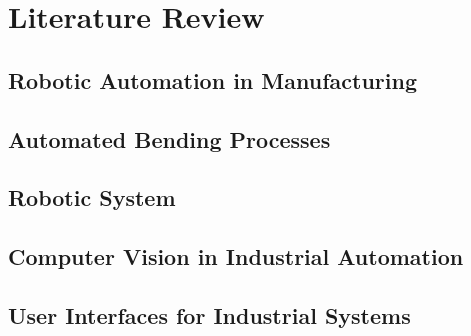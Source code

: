 \chapter{Literature Review}
\label{chap:review}

\setcounter{section}{0}
\setcounter{subsection}{0}
\section{Robotic Automation in Manufacturing}
\label{sec:automation_2}


\section{Automated Bending Processes}
\label{sec:bending_2}


\section{Robotic System}
\label{sec:robot_2}


\section{Computer Vision in Industrial Automation}
\label{sec:CV_2}


\section{User Interfaces for Industrial Systems}
\label{sec:interface_2}
